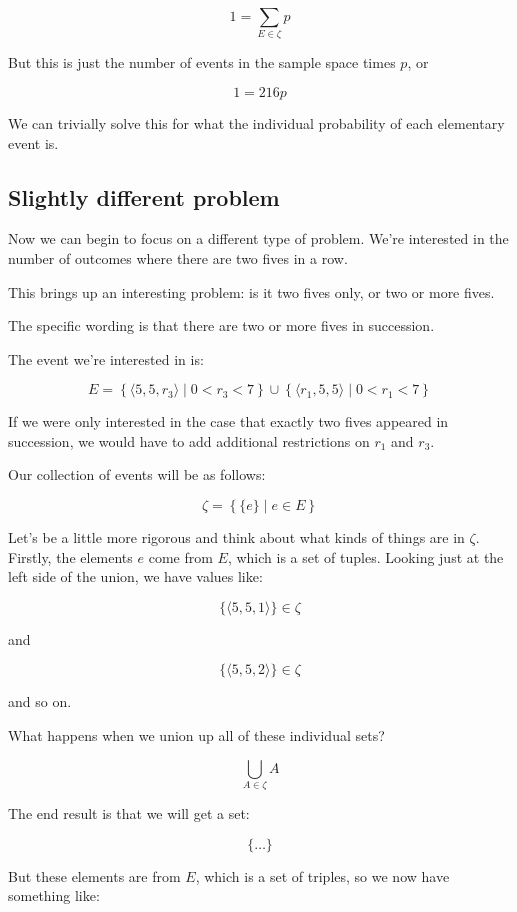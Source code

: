\documentclass{article}
\begin{document}
\[
1 = \sum\limits_{E\in\zeta} p
\]

But this is just the number of events in the sample space times $p$, or

\[
1=216 p
\]

We can trivially solve this for what the individual probability of
each elementary event is.

\subsection*{Slightly different problem}

Now we can begin to focus on a different type of problem. We're
interested in the number of outcomes where there are two fives in a
row.

This brings up an interesting problem: is it two fives only, or two or
more fives.

The specific wording is that there are two or more fives in
succession.

The event we're interested in is:

\[
E =
\left\{\langle 5, 5, r_3 \rangle\mid 0<r_3<7\right\}
\cup
\left\{\langle r_1, 5, 5 \rangle\mid 0<r_1<7\right\}
\]

If we were only interested in the case that exactly two fives appeared
in succession, we would have to add additional restrictions on $r_1$
and $r_3$.

Our collection of events will be as follows:

\[
\zeta=\left\{\{e\}\mid e\in E\right\}
\]

Let's be a little more rigorous and think about what kinds of things
are in $\zeta$. Firstly, the elements $e$ come from $E$, which is a
set of tuples. Looking just at the left side of the union, we have
values like:

\[
\{\langle 5,5,1\rangle\} \in \zeta
\]

and

\[
\{\langle 5,5,2\rangle\} \in \zeta
\]

and so on.

What happens when we union up all of these individual sets?

\[
\bigcup\limits_{A\in\zeta}A
\]

The end result is that we will get a set:

\[
\{\dots\}
\]

But these elements are from $E$, which is a set of triples, so we now
have something like:
\end{document}

